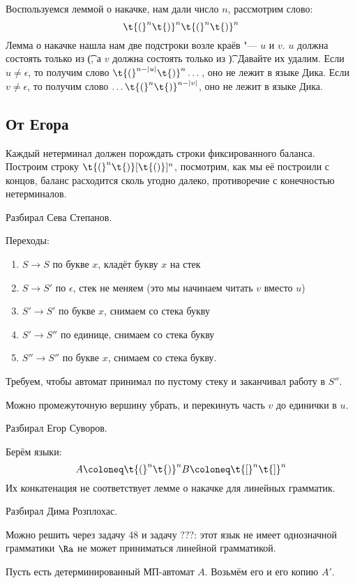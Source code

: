 	Воспользуемся леммой о накачке, нам дали число $n$, рассмотрим слово:
	\[
		\t{(}^n \t{)}^n \t{(}^n \t{)}^n
	\]
	Лемма о накачке нашла нам две подстроки возле краёв "--- $u$ и $v$.
	$u$ должна состоять только из \t{(}, а $v$ должна состоять только из \t{)}.
	Давайте их удалим.
	Если $u \ne \epsilon$, то получим слово $\t{(}^{n-|u|}\t{)}^n\dots$, оно не лежит в языке Дика.
	Если $v \ne \epsilon$, то получим слово $\dots\t{(}^n\t{)}^{n-|v|}$, оно не лежит в языке Дика.

	\subsection{От Егора}
		Каждый нетерминал должен порождать строки фиксированного баланса.
		Построим строку $\t{(}^n\t{)}[\t{()}]^{n}$, посмотрим, как мы её построили с концов, баланс расходится сколь угодно далеко,
		противоречие с конечностью нетерминалов.

	Разбирал Сева Степанов.

	Переходы:
	\begin{enumerate}
		\item
			$S\to S$ по букве $x$, кладёт букву $x$ на стек
		\item
			$S\to S'$ по $\epsilon$, стек не меняем (это мы начинаем читать $v$ вместо $u$)
		\item
			$S' \to S'$ по букве $x$, снимаем со стека букву
		\item
			$S' \to S''$ по единице, снимаем со стека букву
		\item
			$S'' \to S''$ по букве $x$, снимаем со стека букву.
	\end{enumerate}
	Требуем, чтобы автомат принимал по пустому стеку и заканчивал работу в $S''$.

	\begin{Rem}
		Можно промежуточную вершину убрать, и перекинуть часть $v$ до единички в $u$.
	\end{Rem}

	Разбирал Егор Суворов.

	Берём языки:
	\[
		A \coloneq \t{(}^n\t{)}^n \\
		B \coloneq \t{[}^n\t{]}^n
	\]
	Их конкатенация не соответствует лемме о накачке для линейных грамматик.

	Разбирал Дима Розплохас.

	\begin{Rem}
		Можно решить через задачу 48 и задачу ???: этот язык не имеет однозначной грамматики $\Ra$ не может приниматься линейной грамматикой.
	\end{Rem}
	Пусть есть детерминированный МП-автомат $A$.
	Возьмём его и его копию $A'$.

